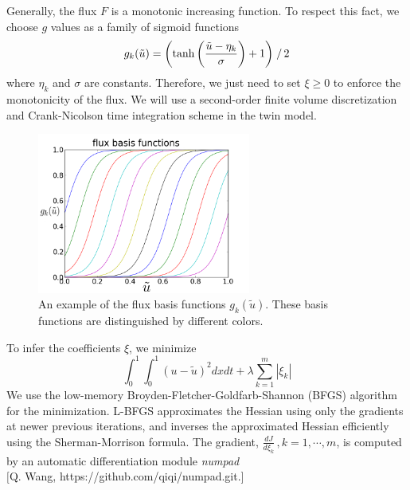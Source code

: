 \documentclass[a4paper,onecolumn]{article}
\theoremstyle{remark}
\begin{document}
\indent Generally, the flux $F$ is a monotonic increasing function. To respect this fact, we
choose $g$ values as a family of sigmoid functions 
\begin{equation}
    g_k(\tilde{u}) = \left(\tanh\left(\frac{\tilde{u}- \eta_k}{\sigma}\right)+1\right) \left.\right/2
    \label{sigmoids}
\end{equation}
where $\eta_k$ and $\sigma$ are constants. Therefore, we just need to set $\xi\ge 0 $ 
to enforce the monotonicity of the flux.
We will use  a second-order finite volume discretization and 
Crank-Nicolson time integration scheme in the twin model.
\begin{figure}[H]\begin{center}
    \includegraphics[width=7cm]{fluxbasis.png}
    \caption{An example of the flux basis functions $g_k(\tilde{u})$. 
    These basis functions are distinguished by different colors.}
\end{center}\end{figure}

To infer the coefficients $\xi$, we minimize
\begin{equation}
    \int_0^1 \int_0^1 (u-\tilde{u})^2 dx dt+ \lambda \sum_{k=1}^m |\xi_k|
\end{equation}
We use the {low-memory Broyden-Fletcher-Goldfarb-Shannon} (BFGS) algorithm
\cite{LBFGS} for the minimization. 
L-BFGS approximates the Hessian using only the gradients at newer previous iterations,
and inverses the approximated Hessian efficiently using the Sherman-Morrison formula.
The gradient, $\frac{dJ}{d\xi_k}\,, k=1,\cdots, m$, 
is computed by an automatic differentiation module \textit{numpad} \\
$[$Q. Wang, https://github.com/qiqi/numpad.git.$]$\\
\end{document}
